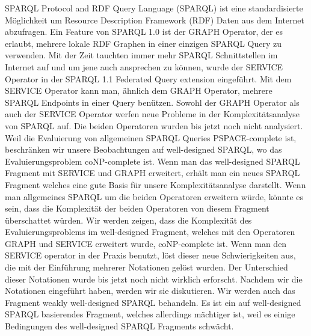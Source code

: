 \documentclass[draft,final]{vutinfth} %
\begin{document}
\begin{kurzfassung}
	SPARQL Protocol and RDF Query Language (SPARQL) ist eine standardisierte
	M{\"o}glichkeit	um Resource Description Framework (RDF) Daten aus dem
	Internet abzufragen. Ein Feature von SPARQL 1.0 ist der GRAPH Operator, der
	es erlaubt, mehrere lokale RDF Graphen in einer einzigen SPARQL Query zu
	verwenden. Mit der Zeit tauchten immer mehr SPARQL Schnittstellen im
	Internet auf
	und um jene auch ansprechen zu k{\"o}nnen, wurde der SERVICE Operator in der
	SPARQL 1.1 Federated Query extension eingef{\"u}hrt. Mit dem SERVICE Operator
	kann man, {\"a}hnlich dem GRAPH Operator, mehrere SPARQL Endpoints in einer
	Query ben{\"u}tzen. Sowohl der GRAPH Operator als auch der SERVICE Operator werfen
	neue
	Probleme in der Komplexit{\"a}tsanalyse von SPARQL auf. Die beiden
	Operatoren wurden bis jetzt noch nicht analysiert. Weil die Evaluierung von
	allgemeinen SPARQL Queries PSPACE-complete ist, beschr{\"a}nken wir unsere
	Beobachtungen auf well-designed SPARQL, wo das Evaluierungsproblem 
	coNP-complete ist. Wenn man das well-designed SPARQL Fragment mit SERVICE
	und GRAPH erweitert, erh{\"a}lt man ein neues SPARQL Fragment welches eine
	gute Basis f{\"u}r unsere Komplexit{\"a}tsanalyse darstellt. Wenn man
	allgemeines SPARQL um die beiden Operatoren erweitern w{\"u}rde, 
	k{\"o}nnte es sein, dass die Komplexit{\"a}t 
	der beiden Operatoren von diesem Fragment
	{\"u}berschattet w{\"u}rden. Wir werden zeigen, dass die 
	Komplexit{\"a}t des Evaluierungsproblems im
	well-designed Fragment, welches mit den Operatoren GRAPH und SERVICE
	erweitert wurde, coNP-complete ist. Wenn man den SERVICE operator in der
	Praxis benutzt, l{\"o}st dieser neue Schwierigkeiten aus, die mit der Einf{\"u}hrung
	mehrerer Notationen gel{\"o}st wurden. Der Unterschied dieser Notationen wurde
	bis jetzt noch nicht wirklich erforscht. Nachdem wir die Notationen
	eingef{\"u}hrt haben, werden wir sie diskutieren. 
	Wir werden auch das Fragment weakly well-designed SPARQL behandeln.
	Es ist ein auf well-designed SPARQL basierendes
	Fragment, welches allerdings m{\"a}chtiger ist, weil es einige Bedingungen des
	well-designed SPARQL Fragments schw{\"a}cht. 
\end{kurzfassung}
\end{document}
